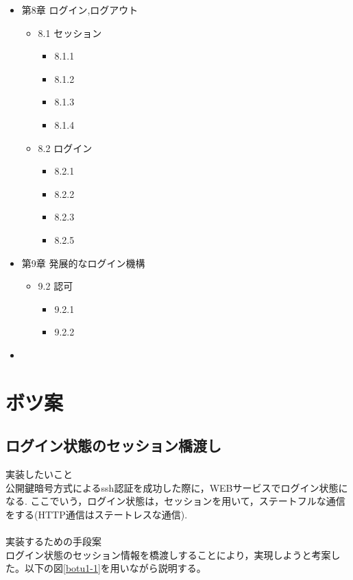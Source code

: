 \begin{itemize}
    \item 第8章 ログイン,ログアウト
    \begin{itemize}
        \item 8.1 セッション
        \begin{itemize}
            \item 8.1.1
            \item 8.1.2
            \item 8.1.3
            \item 8.1.4
        \end{itemize}
        \item 8.2 ログイン
        \begin{itemize}
            \item 8.2.1
            \item 8.2.2
            \item 8.2.3
            \item 8.2.5
        \end{itemize}
    \end{itemize}

    \item 第9章 発展的なログイン機構
    \begin{itemize}
        \item 9.2 認可
        \begin{itemize}
            \item 9.2.1
            \item 9.2.2
        \end{itemize}

    \end{itemize}


\end{itemize}

    \begin{itemize}
        \item
    \end{itemize}



\section{ボツ案}
\subsection{ログイン状態のセッション橋渡し}
\noindent 実装したいこと\\
公開鍵暗号方式によるssh認証を成功した際に，WEBサービスでログイン状態になる.
ここでいう，ログイン状態は，セッションを用いて，ステートフルな通信をする(HTTP通信はステートレスな通信).
\\\\
\noindent 実装するための手段案\\
ログイン状態のセッション情報を橋渡しすることにより，実現しようと考案した。以下の図\ref{botu1-1}を用いながら説明する。

